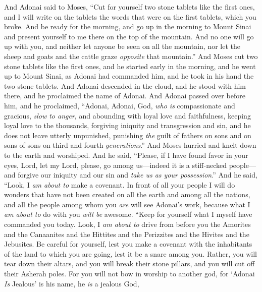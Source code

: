 \begin{biblechapter} %
 And Adonai said to Moses, “Cut for yourself two stone tablets like the first ones, and I will write on the tablets the words that were on the first tablets, which you broke.
\verse And be ready for the morning, and go up in the morning to Mount Sinai and present yourself to me there on the top of the mountain.
\verse And no one will go up with you, and neither let anyone be seen on all the mountain, nor let the sheep and goats and the cattle graze \textit{opposite} that mountain.”
\verse And Moses cut two stone tablets like the first ones, and he started early in the morning, and he went up to Mount Sinai, as Adonai had commanded him, and he took in his hand the two stone tablets.
\verse And Adonai descended in the cloud, and he stood with him there, and he proclaimed the name of Adonai.
\verse And Adonai passed over before him, and he proclaimed, “Adonai, Adonai, God, \textit{who is} compassionate and gracious, \textit{slow to anger}, and abounding with loyal love and faithfulness,
\verse keeping loyal love to the thousands, forgiving iniquity and transgression and sin, and he does not leave utterly unpunished, punishing \textit{the} guilt of fathers on sons and on sons of sons on third and fourth \textit{generations}.”
\verse And Moses hurried and knelt down to the earth and worshiped.
\verse And he said, “Please, if I have found favor in your eyes, Lord, let my Lord, please, go among us—indeed it is a stiff-necked people—and forgive our iniquity and our sin and \textit{take us as your possession}.”
 And he said, “Look, I \textit{am about to} make a covenant. In front of all your people I will do wonders that have not been created on all the earth and among all the nations, and all the people among whom you \textit{are} will see Adonai’s work, because what I \textit{am about to} do with you \textit{will be} awesome.
\verse “Keep for yourself what I myself have commanded you today. Look, I \textit{am about to} drive from before you the Amorites and the Canaanites and the Hittites and the Perizzites and the Hivites and the Jebusites.
\verse Be careful for yourself, lest you make a covenant with the inhabitants of the land to which you are going, lest it be a snare among you.
\verse Rather, you will tear down their altars, and you will break their stone pillars, and you will cut off their Asherah poles.
\verse For you will not bow in worship to another god, for ‘Adonai \textit{Is} Jealous’ is his name, he \textit{is} a jealous God,

\end{biblechapter}
